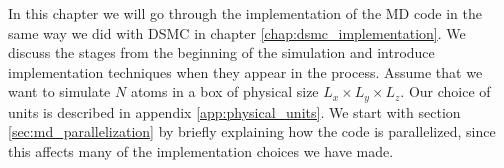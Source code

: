 In this chapter we will go through the implementation of the MD code in the same way we did with DSMC in chapter \ref{chap:dsmc_implementation}. We discuss the stages from the beginning of the simulation and introduce implementation techniques when they appear in the process. Assume that we want to simulate $N$ atoms in a box of physical size $L_x \times L_y \times L_z$. Our choice of units is described in appendix \ref{app:physical_units}. We start with section \ref{sec:md_parallelization} by briefly explaining how the code is parallelized, since this affects many of the implementation choices we have made. 